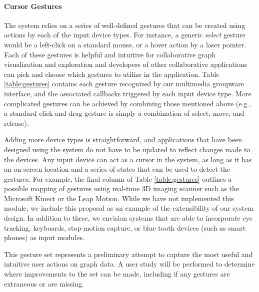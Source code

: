 \documentclass[runningheads,a4paper]{llncs}
\begin{document}
\vspace{-0.1in}
\paragraph{\bf Cursor Gestures}

The system relies on a series of well-defined gestures that can be
created using actions by each of the input device types. For instance,
a generic {\em select} gesture would be a left-click on a standard
mouse, or a hover action by a laser pointer.
%
Each of these gestures is helpful and intuitive for collaborative graph visualization and exploration
and developers of other collaborative applications can pick and choose
which gestures to utilize in the application.
% 
Table \ref{table:gestures} contains each gesture recognized by our
multimedia groupware interface, and the associated callbacks triggered
by each input device type.  More complicated gestures can be achieved
by combining those mentioned above
(e.g., a standard
click-and-drag gesture is simply a combination of select, move, and
release).

Adding more device types is straightforward, and applications that have been designed using the system
do not have to be updated to reflect changes made to the devices.
% 
Any input device can act as a
cursor in the system, as long as it has an on-screen location and a series of states that can be used to 
detect the gestures. 
For example, the final column of Table \ref{table:gestures} outlines a possible mapping of gestures using real-time 3D imaging
scanner such as the Microsoft Kinect or the Leap Motion.  
While we have not implemented this module, 
we include this proposal
as an example of the extensibility of our system design.
In addition to these, we envision systems that are able to incorporate
eye tracking,
keyboards,
stop-motion capture,
or blue tooth devices (such as smart phones)
as input modules.




This gesture set represents a preliminary attempt to capture the most
useful and intuitive user actions on graph data. A user study will be
performed to determine where improvements to the set can be made,
including if any gestures are extraneous or are missing.
\end{document}
